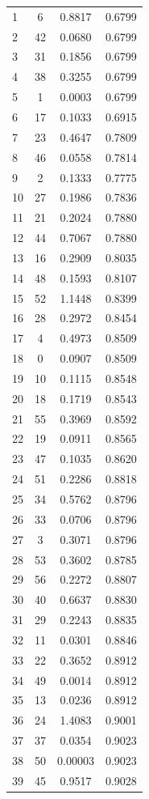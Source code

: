 \documentclass[12pt]{article}
\begin{document}
\begin{longtable}[!htbp]{lccc}
1 & 6 & 0.8817 & 0.6799\\
2 & 42 & 0.0680 & 0.6799\\
3 & 31 & 0.1856 & 0.6799\\
4 & 38 & 0.3255 & 0.6799\\
5 & 1 & 0.0003 & 0.6799\\
6 & 17 & 0.1033 & 0.6915\\
7 & 23 & 0.4647 & 0.7809\\
8 & 46 & 0.0558 & 0.7814\\
9 & 2 & 0.1333 & 0.7775 \\
10 & 27 & 0.1986 & 0.7836\\
11 & 21 & 0.2024 & 0.7880\\
12 & 44 & 0.7067 & 0.7880\\
13 & 16 & 0.2909 & 0.8035\\
14 & 48 & 0.1593 & 0.8107\\
15 & 52 & 1.1448 & 0.8399\\
16 & 28 & 0.2972 & 0.8454\\
17 & 4 & 0.4973 & 0.8509\\
18 & 0 & 0.0907 & 0.8509\\
19 & 10 & 0.1115 & 0.8548\\
20 & 18 & 0.1719 & 0.8543\\
21 & 55 & 0.3969 & 0.8592\\
22 & 19 & 0.0911 & 0.8565\\
23 & 47 & 0.1035 & 0.8620\\
24 & 51 & 0.2286 & 0.8818\\
25 & 34 & 0.5762 & 0.8796\\
26 & 33 & 0.0706 & 0.8796\\
27 & 3 & 0.3071 & 0.8796\\
28 & 53 & 0.3602 & 0.8785\\
29 & 56 & 0.2272 & 0.8807\\
30 & 40 & 0.6637 & 0.8830\\
31 & 29 & 0.2243 & 0.8835\\
32 & 11 & 0.0301 & 0.8846\\
33 & 22 & 0.3652 & 0.8912\\
34 & 49 & 0.0014 & 0.8912\\
35 & 13 & 0.0236 & 0.8912\\
36 & 24 & 1.4083 & 0.9001\\
37 & 37 & 0.0354 & 0.9023\\
38 & 50 & 0.00003 & 0.9023\\
39 & 45 & 0.9517 & 0.9028\\

\end{longtable}
\end{document}
